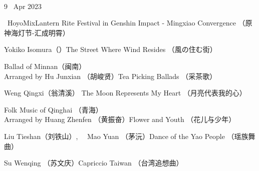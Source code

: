 \documentclass[letter,6pt,poets]{ConcProg}
\begin{document}
\begin{spacing}{1.0}
\begin{programme}{
\\  {\normalsize 9 ~Apr 2023}
}
\begin{part}[]
    \begin{composition}{\ HoyoMix}{}{Lantern Rite Festival in Genshin Impact - Mingxiao Convergence （原神海灯节-汇成明霄）}{}      
    \end{composition} 
    
     \begin{composition}{Yokiko Isomura（）}{}{The Street Where Wind Resides （風の住む街）}{}      
    \end{composition} 
    
     \begin{composition}{Ballad of Minnan（闽南）\\ Arranged by Hu Junxian （胡峻贤）}{}{Tea Picking Ballads （采茶歌）}{}      
    \end{composition} 
    
    \begin{composition}{Weng Qingxi（翁清溪） }{}{The Moon Represents My Heart （月亮代表我的心）}{}      
    \end{composition} 
    
    \begin{composition}{Folk Music of Qinghai	（青海） \\ Arranged by Huang Zhenfen （黄振奋）}{}{Flower and Youth （花儿与少年） }{}      
    \end{composition} 
    
    \begin{composition}{Liu Tieshan（刘铁山）, \ \ Mao Yuan （茅沅）}{}{Dance of the Yao People （瑶族舞曲）}{}      
    \end{composition} 
    
     \begin{composition}{Su Wenqing （苏文庆）}{}{Capriccio Taiwan （台湾追想曲）}{}      
    \end{composition} 
    
    
 
    
    
    
    
    
   
    
  
  \end{part}
  \newpage
\end{programme}


\end{spacing}
\end{document}
